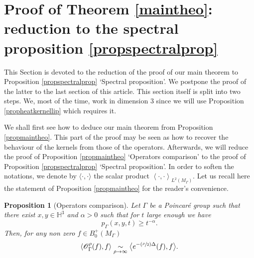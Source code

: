 \documentclass[JEP,XML,SOM,Unicode,NoFloatCountersInSection,published]{cedram}
\let\mathcal\mathscr
\newcommand{\Psfrac}[2]{(\sfrac{#1}{#2})}
\theoremstyle{plain}
\newtheorem{proposition}[equation]{Proposition}
\theoremstyle{definition}
\newcommand{\equivaut}[1]{\underset{#1}{\sim}}
\begin{document}
\section{Proof of Theorem \ref{maintheo}: reduction to the spectral proposition \ref{propspectralprop}}

\label{secproofmaintheo}

This Section is devoted to the reduction of the proof of our main theorem to Proposition \ref{propspectralprop} `Spectral proposition'. We postpone the proof of the latter to the last section of this article. This section itself is split into two steps. We, most of the time, work in dimension $3$ since we will use Proposition \ref{propheatkernellip} which requires it.

We shall first see how to deduce our main theorem from Proposition \ref{propmaintheo}. This part of the proof may be seen as how to recover the behaviour of the kernels from those of the operators. Afterwards, we will reduce the proof of Proposition \ref{propmaintheo} `Operators comparison' to the proof of Proposition \ref{propspectralprop} `Spectral proposition'. In order to soften the notations, we denote by $\langle \cdot, \cdot \rangle$ the scalar product $\left< \cdot, \cdot \right>_{L^2(M_{\Gamma})}$. Let us recall here the statement of Proposition \ref{propmaintheo} for the reader's convenience.

\begin{proposition}[Operators comparison]\label{prop:operatorscomparison}
Let $\Gamma$ be a Poincaré group such that there exist $x,y \in \mathbb{H}^3$ and $\alpha > 0$ such that for $t$ large enough we have
\[
p_{\Gamma}(x,y,t) \ge t^{-\alpha}.
\]
Then, for any non zero $f \in B^+_0(M_{\Gamma})$
\[
\left< \mathcal{O}_{\Gamma}^{\rho}(f), f \right> \equivaut{\rho \to \infty} \bigl< e^{- \Psfrac{\rho}{2} \Delta}(f), f \bigr>.
\]
\end{proposition}
\end{document}
